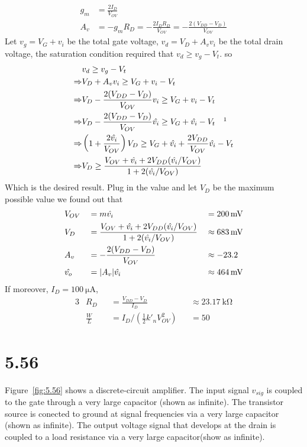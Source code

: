 \documentclass[12pt, a4paper]{article}
\begin{document}
\Ans\\
\begin{align*}
  g_m &= \frac{2I_D}{V_{OV}}\\
  A_v &= -g_m R_D = -\frac{2 I_D R_D}{V_{OV}}  = -\frac{2 (V_{DD} - V_D)}{V_{OV}} 
\end{align*}
Let $v_g = V_G + v_i$ be the total gate voltage, $v_d = V_D + A_v v_i$ be the total drain voltage, the saturation condition required that $v_d \geq v_g - V_t$. so
\begin{align*}
  & v_d \geq v_g - V_t \\
  \Rightarrow & V_D + A_v v_i \geq V_G + v_i - V_t  \\
  \Rightarrow & V_D - \frac{2 (V_{DD} - V_D)}{V_{OV}} v_i \geq V_G + v_i - V_t \\
  \Rightarrow  & V_D - \frac{2 (V_{DD} - V_D)}{V_{OV}} \hat{v_i} \geq V_G + \hat{v_i} - V_t \quad \footnotemark \\
  \Rightarrow & \left(1 + \frac{2\hat{v_i}}{V_{OV}}\right) V_D \geq V_G + \hat{v_i} + \frac{2V_{DD}}{V_{OV}} \hat{v_i}  - V_t  \\
  \Rightarrow & V_D \geq \frac{V_{OV} + \hat{v_i} + 2 V_{DD} (\hat{v_i} / V_{OV}) }{1 + 2(\hat{v_i}/V_{OV})} 
\end{align*}
Which is the desired result.
Plug in the value and let $V_D$ be the maximum possible value we found out that
\begin{alignat*}{3}
  & V_{OV} &&= m \hat{v_i} && = \SI{200}{\mV} \\
  & V_{D} &&= \frac{V_{OV} + \hat{v_i} + 2 V_{DD} (\hat{v_i} / V_{OV}) }{1 + 2(\hat{v_i}/V_{OV})} && \approx \SI{683}{\mV} \\
  & A_v &&= -\frac{2(V_{DD} - V_D)}{V_{OV}}  && \approx -23.2 \\
  & \hat{v_o} &&= \abs{A_v} \hat{v_i} && \approx \SI{464}\mV \\
\end{alignat*}
If moreover, $I_D = \SI{100}{\uA}$,
\begin{alignat*}{3}
  & R_D &&= \frac{V_{DD} - V_D}{I_D}  && \approx \SI{23.17}{\kohm} \\
  & \frac{W}{L} &&= I_D / \left(\frac{1}{2} k'_n V_{OV}^2 \right) && = 50
\end{alignat*}

\section{5.56}
Figure~\ref{fig:5.56} shows a discrete-circuit amplifier. The input signal $v_{sig}$ is coupled to the gate through a very large capacitor (shown as infinite). The transistor source is conected to ground at signal frequencies via a very large capacitor (shown as infinite). The output voltage signal that develops at the drain is coupled to a load resistance via a very large capacitor(show as infinite).
\end{document}
